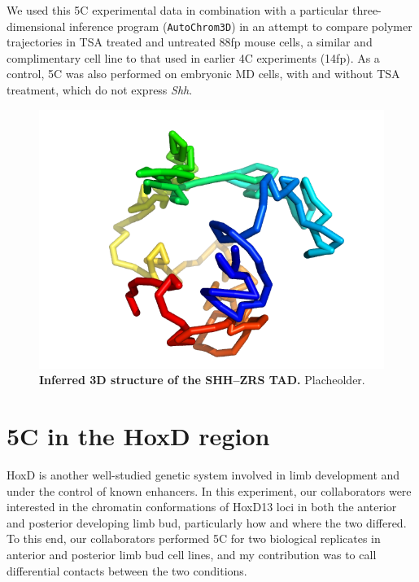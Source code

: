 \documentclass[a4paper,11pt,oneside]{book}
\begin{document}
We used this 5C experimental data in combination with a particular three-dimensional inference program  (\texttt{AutoChrom3D}\cite{Peng2013}) in an attempt to compare polymer trajectories in TSA treated and untreated 88fp mouse cells, a similar and complimentary cell line to that used in earlier 4C experiments (14fp). As a control, 5C was also performed on embryonic MD cells, with and without TSA treatment, which do not express \emph{Shh}.

\begin{figure}
\begin{center} 
\includegraphics[width=5in]{figs/5c_3d.png}
\captionsetup{width=\textwidth} 
\caption[ Inferred 3D structure of the SHH--ZRS TAD. ]{ {\bf Inferred 3D structure of the SHH--ZRS TAD. }
Placheolder.
}\label{fig:5c3d}
\end{center} 
\end{figure} 

\section{5C in the HoxD region}

HoxD is another well-studied genetic system involved in limb development and under the control of known enhancers. In this experiment, our collaborators were interested in the chromatin conformations of HoxD13 loci in both the anterior and posterior developing limb bud, particularly how and where the two differed. To this end, our collaborators performed 5C for two biological replicates in anterior and posterior limb bud cell lines, and my contribution was to call differential contacts between the two conditions.
\end{document}
